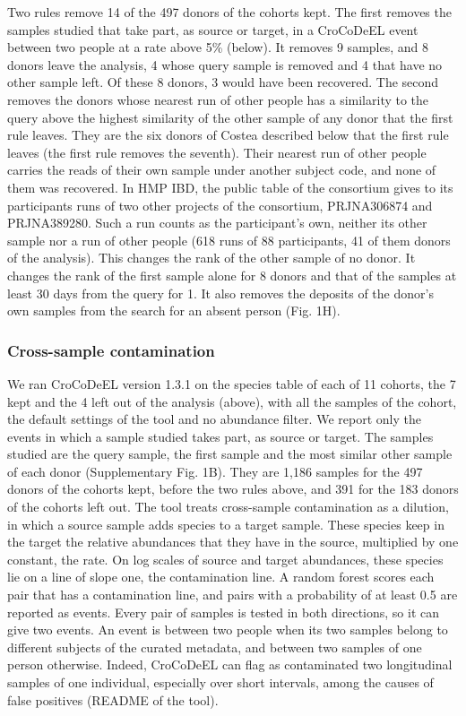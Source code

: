 \documentclass[11pt,a4paper]{article}
\begin{document}
Two rules remove 14 of the 497 donors of the cohorts kept. The first removes the samples studied that take part, as source or target, in a CroCoDeEL event between two people at a rate above 5\% (below). It removes 9 samples, and 8 donors leave the analysis, 4 whose query sample is removed and 4 that have no other sample left. Of these 8 donors, 3 would have been recovered. The second removes the donors whose nearest run of other people has a similarity to the query above the highest similarity of the other sample of any donor that the first rule leaves. They are the six donors of Costea described below that the first rule leaves (the first rule removes the seventh). Their nearest run of other people carries the reads of their own sample under another subject code, and none of them was recovered. In HMP IBD, the public table of the consortium gives to its participants runs of two other projects of the consortium, PRJNA306874 and PRJNA389280. Such a run counts as the participant's own, neither its other sample nor a run of other people (618 runs of 88 participants, 41 of them donors of the analysis). This changes the rank of the other sample of no donor. It changes the rank of the first sample alone for 8 donors and that of the samples at least 30 days from the query for 1. It also removes the deposits of the donor's own samples from the search for an absent person (Fig. 1H).

\subsubsection*{Cross-sample contamination}

We ran CroCoDeEL version 1.3.1 on the species table of each of 11 cohorts, the 7 kept and the 4 left out of the analysis (above), with all the samples of the cohort, the default settings of the tool and no abundance filter. We report only the events in which a sample studied takes part, as source or target. The samples studied are the query sample, the first sample and the most similar other sample of each donor (Supplementary Fig. 1B). They are 1,186 samples for the 497 donors of the cohorts kept, before the two rules above, and 391 for the 183 donors of the cohorts left out. The tool treats cross-sample contamination as a dilution, in which a source sample adds species to a target sample. These species keep in the target the relative abundances that they have in the source, multiplied by one constant, the rate. On log scales of source and target abundances, these species lie on a line of slope one, the contamination line. A random forest scores each pair that has a contamination line, and pairs with a probability of at least 0.5 are reported as events. Every pair of samples is tested in both directions, so it can give two events. An event is between two people when its two samples belong to different subjects of the curated metadata, and between two samples of one person otherwise. Indeed, CroCoDeEL can flag as contaminated two longitudinal samples of one individual, especially over short intervals, among the causes of false positives\cite{goulet2026} (README of the tool).
\end{document}
